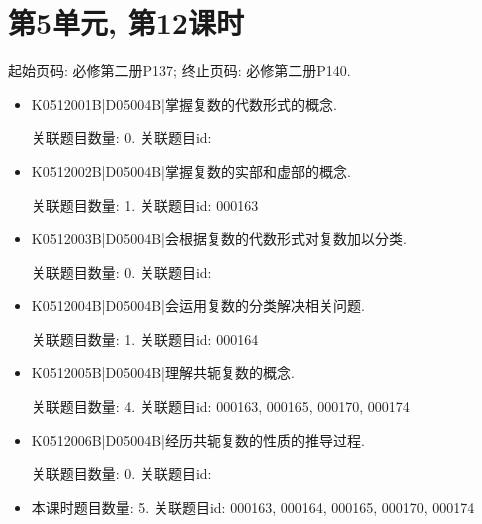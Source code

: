 \section*{第5单元, 第12课时}
起始页码: 必修第二册P137; 终止页码: 必修第二册P140.
\begin{itemize}
\item K0512001B|D05004B|掌握复数的代数形式的概念.

关联题目数量: 0. 关联题目id: 

\item K0512002B|D05004B|掌握复数的实部和虚部的概念.

关联题目数量: 1. 关联题目id: 000163

\item K0512003B|D05004B|会根据复数的代数形式对复数加以分类.

关联题目数量: 0. 关联题目id: 

\item K0512004B|D05004B|会运用复数的分类解决相关问题.

关联题目数量: 1. 关联题目id: 000164

\item K0512005B|D05004B|理解共轭复数的概念.

关联题目数量: 4. 关联题目id: 000163, 000165, 000170, 000174

\item K0512006B|D05004B|经历共轭复数的性质的推导过程.

关联题目数量: 0. 关联题目id: 

\item 本课时题目数量: 5. 关联题目id: 000163, 000164, 000165, 000170, 000174

\end{itemize}

